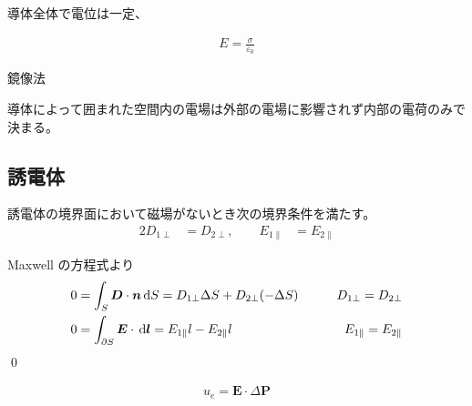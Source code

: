 \documentclass[uplatex,dvipdfmx,a4paper,11pt]{jlreq}
\makeatletter
\newcommand{\EE}{\bm{E}}
\newcommand{\DD}{\bm{D}}
\numberwithin{equation}{section}
\theoremstyle{definition}
\renewenvironment{proof}[1][\proofname]{\par
  \normalfont
  \topsep6\p@\@plus6\p@ \trivlist
  \item[\hskip\labelsep{\bfseries #1}\@addpunct{\bfseries}]\ignorespaces\quad\par
}{%
  \qed\endtrivlist\@endpefalse
}
\renewcommand\proofname{証明}
\makeatother
\begin{document}
導体全体で電位は一定、

\begin{theorem}
  \begin{align}
    E = \frac{\sigma}{\varepsilon_0}
  \end{align}
\end{theorem}

\begin{definition}[静電誘導]

\end{definition}

\begin{proposition}[半無限導体と点電荷]
  鏡像法
\end{proposition}

\begin{proposition}[一様外部電場中の導体球]
\end{proposition}

\begin{definition}[静電遮蔽]
  導体によって囲まれた空間内の電場は外部の電場に影響されず内部の電荷のみで決まる。
\end{definition}


\subsection{誘電体}
\begin{theorem}[境界条件]
  誘電体の境界面において磁場がないとき次の境界条件を満たす。
  \begin{alignat}{2}
    D_{1\perp} & = D_{2\perp}, \qquad E_{1\parallel} & = E_{2\parallel}
  \end{alignat}
\end{theorem}
\begin{proof}
  Maxwell の方程式より
  \begin{alignat}{2}
    0 & = \int_S\DD\cdot\bm{n}\dl{S} = D_{1\perp}\Delta S + D_{2\perp}(-\Delta S)  \qquad & D_{1\perp} = D_{2\perp}         \\
    0 & = \int_{\partial S}\EE\cdot\dl{\bm{l}} = E_{1\parallel}l - E_{2\parallel}l \qquad & E_{1\parallel} = E_{2\parallel}
  \end{alignat}
\end{proof}

\begin{theorem}[誘電体のエネルギー]
  \begin{align}
    u_e = \EE\cdot\Delta \bm{P}
  \end{align}
\end{theorem}
\end{document}
